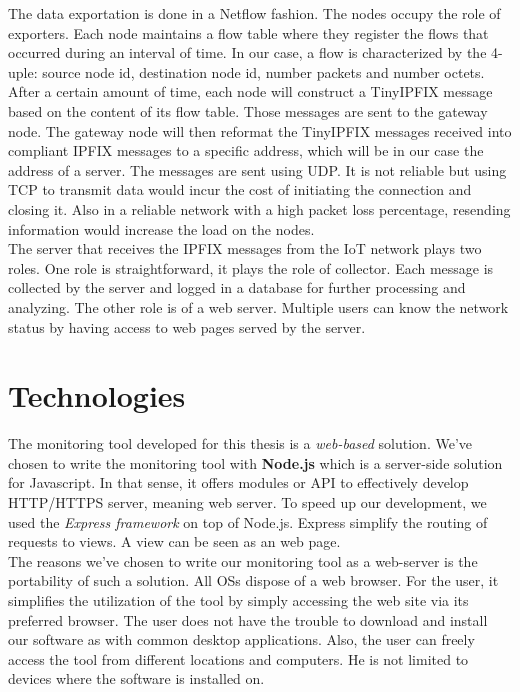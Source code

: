 The data exportation is done in a Netflow fashion. The nodes occupy the role of exporters. Each node maintains a flow table where they register the flows that occurred during an interval of time. In our case, a flow is characterized by the 4-uple: source node id, destination node id, number packets and number octets. After a certain amount of time, each node will construct a TinyIPFIX message based on the content of its flow table. Those messages are sent to the gateway node. The gateway node will then reformat the TinyIPFIX messages received into compliant IPFIX messages to a specific address, which will be in our case the address of a server. The messages are sent using UDP. It is not reliable but using TCP to transmit data would incur the cost of initiating the connection and closing it. Also in a reliable network with a high packet loss percentage, resending information would increase the load on the nodes.\\

The server that receives the IPFIX messages from the IoT network plays two roles. One role is straightforward, it plays the role of collector. Each message is collected by the server and logged in a database for further processing and analyzing. The other role is of a web server. Multiple users can know the network status by having access to web pages served by the server.

\section{Technologies}

The monitoring tool developed for this thesis is a \textit{web-based} solution. We've chosen to write the monitoring tool with \textbf{Node.js} \cite{website:nodejs} which is a server-side solution for Javascript. In that sense, it offers modules or API to effectively develop HTTP/HTTPS server, meaning web server. To speed up our development, we used the \textit{Express framework} \cite{website:express} on top of Node.js. Express simplify the routing of requests to views. A view can be seen as an web page. \\

The reasons we've chosen to write our monitoring tool as a web-server is the portability of such a solution. All OSs dispose of a web browser. For the user, it simplifies the utilization of the tool by simply accessing the web site via its preferred browser. The user does not have the trouble to download and install our software as with common desktop applications. Also, the user can freely access the tool from different locations and computers. He is not limited to devices where the software is installed on. \\

